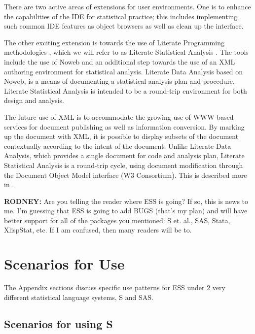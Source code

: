 \documentclass{article}
\begin{document}
There are two active areas of extensions for user environments.  One
is to enhance the capabilities of the IDE for statistical practice;
this includes implementing such common IDE features as object browsers
as well as clean up the interface.

The other exciting extension is towards the use of Literate
Programming methodologies \citep{Knuth:1992,NRamsey:1994}, which we
will refer to as Literate Statistical Analysis \citep{ross:lunt:2001}.
The tools include the use of Noweb \citep{NRamsey:1994} and an
additional step towards the use of an XML authoring environment for
statistical analysis.  Literate Data Analysis based on Noweb, is a
means of documenting a statistical analysis plan and procedure.
Literate Statistical Analysis is intended to be a round-trip
environment for both design and analysis.

The future use of XML is to accommodate the growing use of WWW-based
services for document publishing as well as information conversion.
By marking up the document with XML, it is possible to display subsets
of the document contextually according to the intent of the document.
Unlike Literate Data Analysis, which provides a single document for
code and analysis plan, Literate Statistical Analysis is a round-trip
cycle, using document modification through the Document Object Model
interface (W3 Consortium).  This is described more in
\citep{ross:lunt:2001}. 

\textbf{RODNEY:} Are you telling the reader where ESS is going?  If
so, this is news to me.  I'm guessing that ESS is going to add BUGS
(that's my plan) and will have better support for all of the packages
you mentioned: S et.  al., SAS, Stata, XlispStat, etc.  If I am
confused, then many readers will be to.



\appendix


\section{Scenarios for Use}
\label{app:scenarios}

The Appendix sections discuss specific use patterns for ESS under 2 very
different statistical language systems, S and SAS.

\subsection{Scenarios for using S}
\label{sec:S:scenarios}
\end{document}
